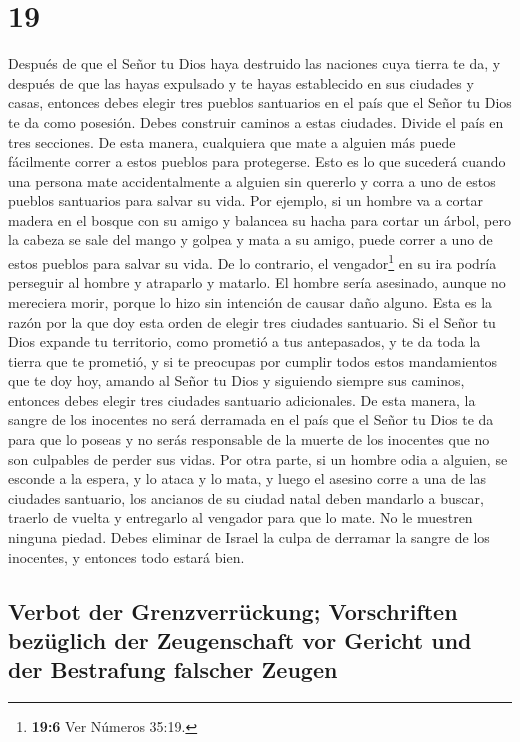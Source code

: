 \hypertarget{section-18}{%
\section{19}\label{section-18}}

 Después de que el Señor tu Dios haya destruido las
naciones cuya tierra te da, y después de que las hayas expulsado y te
hayas establecido en sus ciudades y casas,  entonces debes
elegir tres pueblos santuarios en el país que el Señor tu Dios te da
como posesión.  Debes construir caminos a estas ciudades.
Divide el país en tres secciones. De esta manera, cualquiera que mate a
alguien más puede fácilmente correr a estos pueblos para protegerse.
 Esto es lo que sucederá cuando una persona mate
accidentalmente a alguien sin quererlo y corra a uno de estos pueblos
santuarios para salvar su vida.  Por ejemplo, si un hombre
va a cortar madera en el bosque con su amigo y balancea su hacha para
cortar un árbol, pero la cabeza se sale del mango y golpea y mata a su
amigo, puede correr a uno de estos pueblos para salvar su vida.
 De lo contrario, el vengador\footnote{\textbf{19:6} Ver
  Números 35:19.} en su ira podría perseguir al hombre y atraparlo y
matarlo. El hombre sería asesinado, aunque no mereciera morir, porque lo
hizo sin intención de causar daño alguno.  Esta es la
razón por la que doy esta orden de elegir tres ciudades santuario.
 Si el Señor tu Dios expande tu territorio, como prometió
a tus antepasados, y te da toda la tierra que te prometió,
 y si te preocupas por cumplir todos estos mandamientos
que te doy hoy, amando al Señor tu Dios y siguiendo siempre sus caminos,
entonces debes elegir tres ciudades santuario adicionales.
 De esta manera, la sangre de los inocentes no será
derramada en el país que el Señor tu Dios te da para que lo poseas y no
serás responsable de la muerte de los inocentes que no son culpables de
perder sus vidas.  Por otra parte, si un hombre odia a
alguien, se esconde a la espera, y lo ataca y lo mata, y luego el
asesino corre a una de las ciudades santuario,  los
ancianos de su ciudad natal deben mandarlo a buscar, traerlo de vuelta y
entregarlo al vengador para que lo mate.  No le muestren
ninguna piedad. Debes eliminar de Israel la culpa de derramar la sangre
de los inocentes, y entonces todo estará bien.

\hypertarget{verbot-der-grenzverruxfcckung-vorschriften-bezuxfcglich-der-zeugenschaft-vor-gericht-und-der-bestrafung-falscher-zeugen}{%
\subsection{Verbot der Grenzverrückung; Vorschriften bezüglich der
Zeugenschaft vor Gericht und der Bestrafung falscher
Zeugen}\label{verbot-der-grenzverruxfcckung-vorschriften-bezuxfcglich-der-zeugenschaft-vor-gericht-und-der-bestrafung-falscher-zeugen}}

